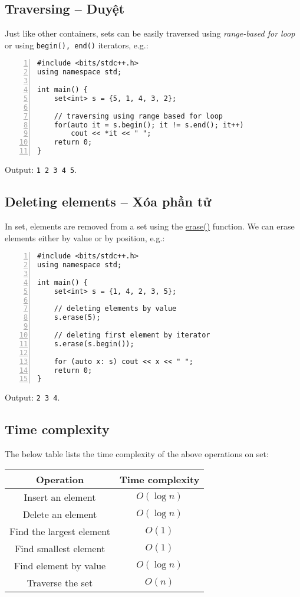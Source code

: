 \documentclass{article}
\begin{document}

\subsection{Traversing -- Duyệt}
Just like other containers, sets can be easily traversed using {\it range-based for loop} or using {\tt begin(), end()} iterators, e.g.:
\begin{Verbatim}[numbers=left,xleftmargin=5mm]
#include <bits/stdc++.h>
using namespace std;

int main() {
    set<int> s = {5, 1, 4, 3, 2};
	
    // traversing using range based for loop
    for(auto it = s.begin(); it != s.end(); it++)
        cout << *it << " ";
    return 0;
}
\end{Verbatim}
Output: {\tt1 2 3 4 5}.


\subsection{Deleting elements -- Xóa phần tử}
In set, elements are removed from a set using the \href{https://www.geeksforgeeks.org/seterase-c-stl/}{erase()} function. We can erase elements either by value or by position, e.g.:
\begin{Verbatim}[numbers=left,xleftmargin=5mm]
#include <bits/stdc++.h>
using namespace std;

int main() {
    set<int> s = {1, 4, 2, 3, 5};
	
    // deleting elements by value
    s.erase(5);
	
    // deleting first element by iterator
    s.erase(s.begin());
	
    for (auto x: s) cout << x << " ";
    return 0;
}
\end{Verbatim}
Output: {\tt2 3 4}.


\subsection{Time complexity}
The below table lists the time complexity of the above operations on set:
\begin{table}[H]
	\centering
	\begin{tabular}{|c|c|}
		\hline
		Operation & Time complexity \\
		\hline
		Insert an element & $O(\log n)$ \\
		\hline
		Delete an element & $O(\log n)$ \\
		\hline
		Find the largest element & $O(1)$ \\
		\hline
		Find smallest element & $O(1)$ \\
		\hline
		Find element by value & $O(\log n)$ \\
		\hline
		Traverse the set & $O(n)$ \\
		\hline
	\end{tabular}
\end{table}
\end{document}
